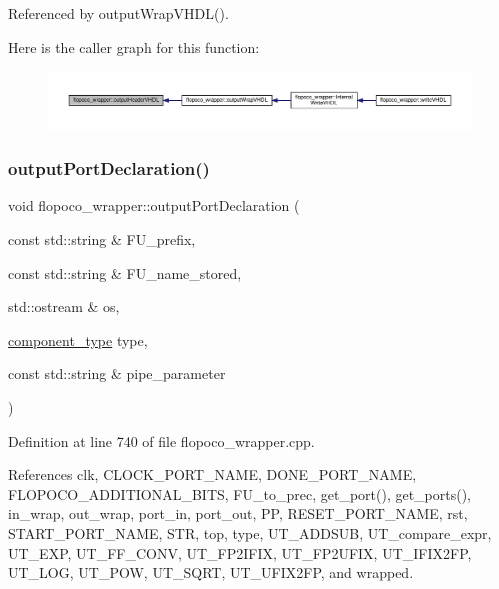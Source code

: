 Referenced by output\+Wrap\+V\+H\+D\+L().

Here is the caller graph for this function\+:
\nopagebreak
\begin{figure}[H]
\begin{center}
\leavevmode
\includegraphics[width=350pt]{d7/dbf/classflopoco__wrapper_a7e97147311b48f0fc5d3463bc88896bf_icgraph}
\end{center}
\end{figure}
\mbox{\label{classflopoco__wrapper_a121477e55d07d3d493c879d80ddb5770}} 
\subsubsection{\texorpdfstring{output\+Port\+Declaration()}{outputPortDeclaration()}}
{\footnotesize\ttfamily void flopoco\+\_\+wrapper\+::output\+Port\+Declaration (\begin{DoxyParamCaption}\item[{const std\+::string \&}]{F\+U\+\_\+prefix,  }\item[{const std\+::string \&}]{F\+U\+\_\+name\+\_\+stored,  }\item[{std\+::ostream \&}]{os,  }\item[{\hyperlink{classflopoco__wrapper_a143045f6fc28429886895b54849d901d}{component\+\_\+type}}]{type,  }\item[{const std\+::string \&}]{pipe\+\_\+parameter }\end{DoxyParamCaption})\hspace{0.3cm}{\ttfamily [private]}}



Definition at line 740 of file flopoco\+\_\+wrapper.\+cpp.



References clk, C\+L\+O\+C\+K\+\_\+\+P\+O\+R\+T\+\_\+\+N\+A\+ME, D\+O\+N\+E\+\_\+\+P\+O\+R\+T\+\_\+\+N\+A\+ME, F\+L\+O\+P\+O\+C\+O\+\_\+\+A\+D\+D\+I\+T\+I\+O\+N\+A\+L\+\_\+\+B\+I\+TS, F\+U\+\_\+to\+\_\+prec, get\+\_\+port(), get\+\_\+ports(), in\+\_\+wrap, out\+\_\+wrap, port\+\_\+in, port\+\_\+out, PP, R\+E\+S\+E\+T\+\_\+\+P\+O\+R\+T\+\_\+\+N\+A\+ME, rst, S\+T\+A\+R\+T\+\_\+\+P\+O\+R\+T\+\_\+\+N\+A\+ME, S\+TR, top, type, U\+T\+\_\+\+A\+D\+D\+S\+UB, U\+T\+\_\+compare\+\_\+expr, U\+T\+\_\+\+E\+XP, U\+T\+\_\+\+F\+F\+\_\+\+C\+O\+NV, U\+T\+\_\+\+F\+P2\+I\+F\+IX, U\+T\+\_\+\+F\+P2\+U\+F\+IX, U\+T\+\_\+\+I\+F\+I\+X2\+FP, U\+T\+\_\+\+L\+OG, U\+T\+\_\+\+P\+OW, U\+T\+\_\+\+S\+Q\+RT, U\+T\+\_\+\+U\+F\+I\+X2\+FP, and wrapped.



